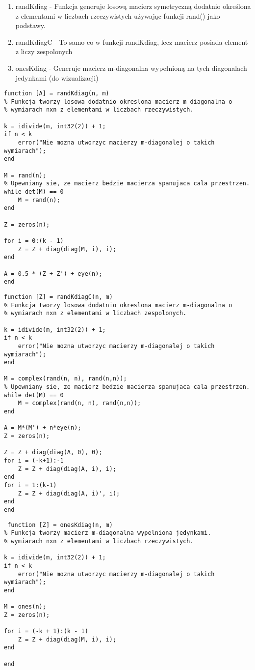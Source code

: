 \documentclass[12pt]{article}
\begin{document}
\begin{enumerate}
    \item randKdiag - Funkcja generuje losową macierz symetryczną dodatnio określona z elementami w liczbach rzeczywistych używając funkcji rand() jako podstawy.
    \item randKdiagC - To samo co w funkcji randKdiag, lecz macierz posiada element z liczy zespolonych
    \item onesKdiag - Generuje macierz m-diagonalna wypełnioną na tych diagonalach jedynkami (do wizualizacji)
\end{enumerate}

\begin{lstlisting}
function [A] = randKdiag(n, m)
% Funkcja tworzy losowa dodatnio okreslona macierz m-diagonalna o
% wymiarach nxn z elementami w liczbach rzeczywistych.

k = idivide(m, int32(2)) + 1;
if n < k
    error("Nie mozna utworzyc macierzy m-diagonalej o takich wymiarach");
end

M = rand(n);
% Upewniany sie, ze macierz bedzie macierza spanujaca cala przestrzen. 
while det(M) == 0
    M = rand(n);
end

Z = zeros(n);

for i = 0:(k - 1)
    Z = Z + diag(diag(M, i), i);
end

A = 0.5 * (Z + Z') + eye(n);
end
\end{lstlisting}

\begin{lstlisting}
function [Z] = randKdiagC(n, m)
% Funkcja tworzy losowa dodatnio okreslona macierz m-diagonalna o
% wymiarach nxn z elementami w liczbach zespolonych.

k = idivide(m, int32(2)) + 1;
if n < k
    error("Nie mozna utworzyc macierzy m-diagonalej o takich wymiarach");
end

M = complex(rand(n, n), rand(n,n));
% Upewniany sie, ze macierz bedzie macierza spanujaca cala przestrzen. 
while det(M) == 0
    M = complex(rand(n, n), rand(n,n));
end

A = M*(M') + n*eye(n);
Z = zeros(n);

Z = Z + diag(diag(A, 0), 0);
for i = (-k+1):-1
    Z = Z + diag(diag(A, i), i);
end
for i = 1:(k-1)
    Z = Z + diag(diag(A, i)', i);
end
end
\end{lstlisting}

 \begin{lstlisting}
 function [Z] = onesKdiag(n, m)
% Funkcja tworzy macierz m-diagonalna wypelniona jedynkami.
% wymiarach nxn z elementami w liczbach rzeczywistych.

k = idivide(m, int32(2)) + 1;
if n < k
    error("Nie mozna utworzyc macierzy m-diagonalej o takich wymiarach");
end

M = ones(n);
Z = zeros(n);

for i = (-k + 1):(k - 1)
    Z = Z + diag(diag(M, i), i);
end

end
 \end{lstlisting}
\end{document}
